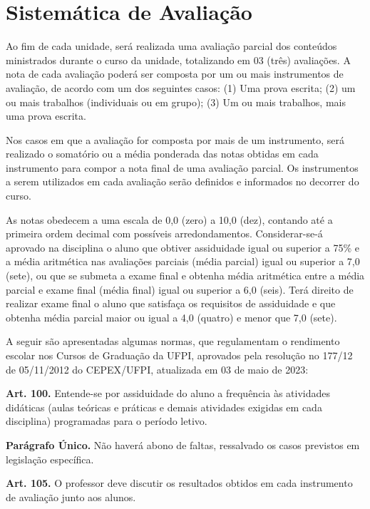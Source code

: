 \documentclass[a4paper, 12pt]{article}
\begin{document}
\section{Sistemática de Avaliação}

Ao fim de cada unidade, será realizada uma avaliação parcial dos conteúdos ministrados durante o curso da unidade, totalizando em 03 (três) avaliações. A nota de cada avaliação poderá ser composta por um ou mais instrumentos de avaliação, de acordo com um dos seguintes casos: (1) Uma prova escrita; (2) um ou mais trabalhos (individuais ou em grupo); (3) Um ou mais trabalhos, mais uma prova escrita.

Nos casos em que a avaliação for composta por mais de um instrumento, será realizado o somatório ou a média ponderada das notas obtidas em cada instrumento para compor a nota final de uma avaliação parcial. Os instrumentos a serem utilizados em cada avaliação serão definidos e informados no decorrer do curso.

As notas obedecem a uma escala de 0,0 (zero) a 10,0 (dez), contando até a primeira ordem decimal com possíveis arredondamentos. Considerar-se-á aprovado na disciplina o aluno que obtiver assiduidade igual ou superior a 75\% e a média aritmética nas avaliações parciais (média parcial) igual ou superior a 7,0 (sete), ou que se submeta a exame final e obtenha média aritmética entre a média parcial e exame final (média final) igual ou superior a 6,0 (seis). Terá direito de realizar exame final o aluno que satisfaça os requisitos de assiduidade e que obtenha média parcial maior ou igual a 4,0 (quatro) e menor que 7,0 (sete).

A seguir são apresentadas algumas normas, que regulamentam o rendimento escolar
nos Cursos de Graduação da UFPI, aprovados pela resolução no 177/12 de 05/11/2012 do CEPEX/UFPI, atualizada em 03 de maio de 2023:

\vspace{10pt}

\noindent\textbf{Art. 100.} Entende-se por assiduidade do aluno a frequência às atividades didáticas (aulas teóricas e práticas e demais atividades exigidas em cada disciplina) programadas para o período letivo.

\textbf{Parágrafo Único.} Não haverá abono de faltas, ressalvado os casos previstos em legislação específica.

\noindent\textbf{Art. 105.} O professor deve discutir os resultados obtidos em cada instrumento de avaliação junto aos alunos.
\end{document}
